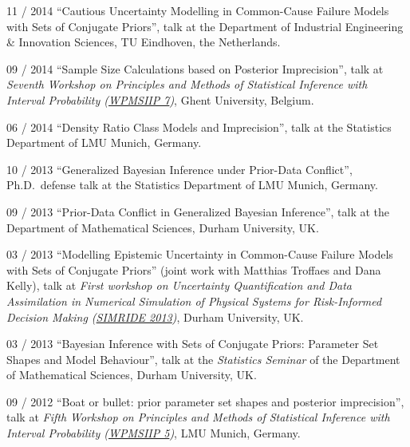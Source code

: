 \documentclass[a4paper]{simplecv}
\begin{document}
\begin{topic}
\item[11 / 2014] ``Cautious Uncertainty Modelling in Common-Cause Failure Models with Sets of Conjugate Priors'', talk at
                 the Department of Industrial Engineering \& Innovation Sciences, TU Eindhoven, the Netherlands.
\item[09 / 2014] ``Sample Size Calculations based on Posterior Imprecision'', talk at
                 \emph{Seventh Workshop on Principles and Methods of Statistical Inference with Interval Probability (\href{http://users.ugent.be/~slopatat/wpmsiip2014/index.html}{WPMSIIP 7})},
                 Ghent University, Belgium.

\item[06 / 2014] ``Density Ratio Class Models and Imprecision'',
                 talk at the Statistics Department of LMU Munich, Germany.

\item[10 / 2013] ``Generalized Bayesian Inference under Prior-Data Conflict'', Ph.D.\ defense talk at
                 the Statistics Department of LMU Munich, Germany.

\item[09 / 2013] ``Prior-Data Conflict in Generalized Bayesian Inference'', talk at
                 the Department of Mathematical Sciences, Durham University, UK.

\item[03 / 2013] ``Modelling Epistemic Uncertainty in Common-Cause Failure Models with Sets of Conjugate Priors''
                 (joint work with Matthias Troffaes and Dana Kelly), talk at
                 \emph{First workshop on Uncertainty Quantification and Data Assimilation in Numerical Simulation of Physical Systems
                 for Risk-Informed Decision Making (\href{http://www.maths.dur.ac.uk/users/matthias.troffaes/simride2013/}{SIMRIDE 2013})}, Durham University, UK.

\item[03 / 2013] ``Bayesian Inference with Sets of Conjugate Priors: Parameter Set Shapes and Model Behaviour'', talk at the
                 \emph{Statistics Seminar} of the Department of Mathematical Sciences, Durham University, UK.

\item[09 / 2012] ``Boat or bullet: prior parameter set shapes and posterior imprecision'', talk at
                 \emph{Fifth Workshop on Principles and Methods of Statistical Inference with Interval Probability (\href{http://statsoz-neu.userweb.mwn.de/research/WPMSIIP_2012/}{WPMSIIP 5})},
                 LMU Munich, Germany.


\end{topic}
\end{document}

